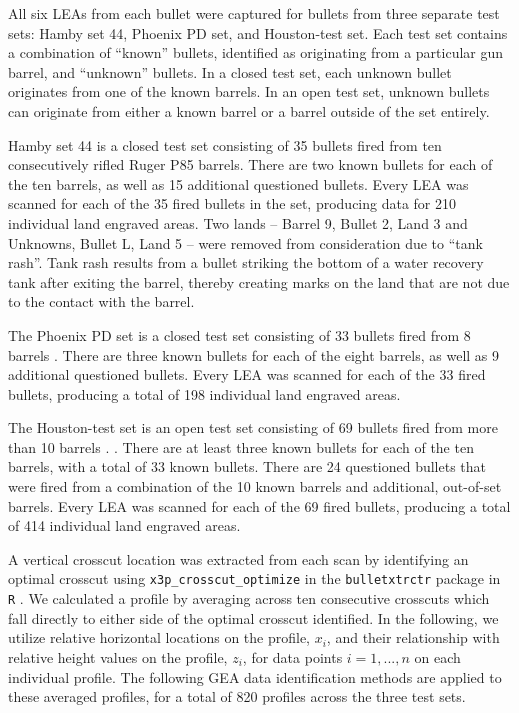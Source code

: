\documentclass[12pt]{article}
\begin{document}
All six LEAs from each bullet were captured for bullets from three
separate test sets: Hamby set 44, Phoenix PD set, and Houston-test set.
Each test set contains a combination of ``known'' bullets, identified as
originating from a particular gun barrel, and ``unknown'' bullets. In a
closed test set, each unknown bullet originates from one of the known
barrels. In an open test set, unknown bullets can originate from either
a known barrel or a barrel outside of the set entirely.

Hamby set 44 is a closed test set consisting of 35 bullets fired from
ten consecutively rifled Ruger P85 barrels. There are two known bullets
for each of the ten barrels, as well as 15 additional questioned
bullets. Every LEA was scanned for each of the 35 fired bullets in the
set, producing data for 210 individual land engraved areas. Two lands --
Barrel 9, Bullet 2, Land 3 and Unknowns, Bullet L, Land 5 -- were
removed from consideration due to ``tank rash''. Tank rash results from
a bullet striking the bottom of a water recovery tank after exiting the
barrel, thereby creating marks on the land that are not due to the
contact with the barrel.

The Phoenix PD set is a closed test set consisting of 33 bullets fired
from 8 barrels {\color{teal}{more information on the type of barrels?}}.
There are three known bullets for each of the eight barrels, as well as
9 additional questioned bullets. Every LEA was scanned for each of the
33 fired bullets, producing a total of 198 individual land engraved
areas.

The Houston-test set is an open test set consisting of 69 bullets fired
from more than 10 barrels
{\color{teal}{more information on the type of barrels?}}.
{\color{purple}{Reference to where more info can be found}}. There are
at least three known bullets for each of the ten barrels, with a total
of 33 known bullets. There are 24 questioned bullets that were fired
from a combination of the 10 known barrels and additional, out-of-set
barrels. Every LEA was scanned for each of the 69 fired bullets,
producing a total of 414 individual land engraved areas.

A vertical crosscut location was extracted from each scan by identifying
an optimal crosscut using \texttt{x3p\_crosscut\_optimize} in the
\texttt{bulletxtrctr} package in \texttt{R} \cite{bulletxtrctr}. We
calculated a profile by averaging across ten consecutive crosscuts which
fall directly to either side of the optimal crosscut identified. In the
following, we utilize relative horizontal locations on the profile,
\(x_i\), and their relationship with relative height values on the
profile, \(z_i\), for data points \(i = 1, ..., n\) on each individual
profile. The following GEA data identification methods are applied to
these averaged profiles, for a total of 820 profiles across the three
test sets.
\end{document}

